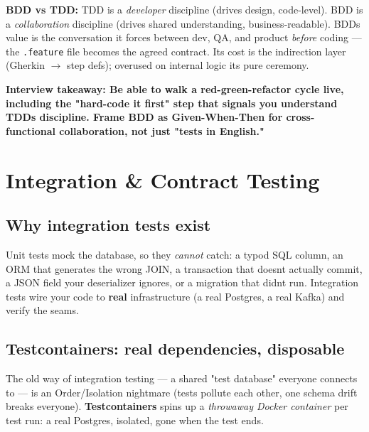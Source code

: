 \documentclass[11pt]{article}
\begin{document}
\textbf{BDD vs TDD:} TDD is a \emph{developer} discipline (drives design, code-level). BDD is a \emph{collaboration} discipline (drives shared understanding, business-readable). BDD\textquotesingle s value is the conversation it forces between dev, QA, and product \emph{before} coding --- the \texttt{.feature} file becomes the agreed contract. Its cost is the indirection layer (Gherkin \(\rightarrow\) step defs); overused on internal logic it\textquotesingle s pure ceremony.

\textbf{Interview takeaway: Be able to walk a red-green-refactor cycle live, including the "hard-code it first" step that signals you understand TDD\textquotesingle s discipline. Frame BDD as Given-When-Then for cross-functional collaboration, not just "tests in English."}

\section{Integration \& Contract Testing}\label{integration--contract-testing}

\subsection{Why integration tests exist}\label{why-integration-tests-exist}

Unit tests mock the database, so they \emph{cannot} catch: a typo\textquotesingle d SQL column, an ORM that generates the wrong JOIN, a transaction that doesn\textquotesingle t actually commit, a JSON field your deserializer ignores, or a migration that didn\textquotesingle t run. Integration tests wire your code to \textbf{real} infrastructure (a real Postgres, a real Kafka) and verify the seams.

\subsection{Testcontainers: real dependencies, disposable}\label{testcontainers-real-dependencies-disposable}

The old way of integration testing --- a shared "test database" everyone connects to --- is an Order/Isolation nightmare (tests pollute each other, one schema drift breaks everyone). \textbf{Testcontainers} spins up a \emph{throwaway Docker container} per test run: a real Postgres, isolated, gone when the test ends.

\end{document}
